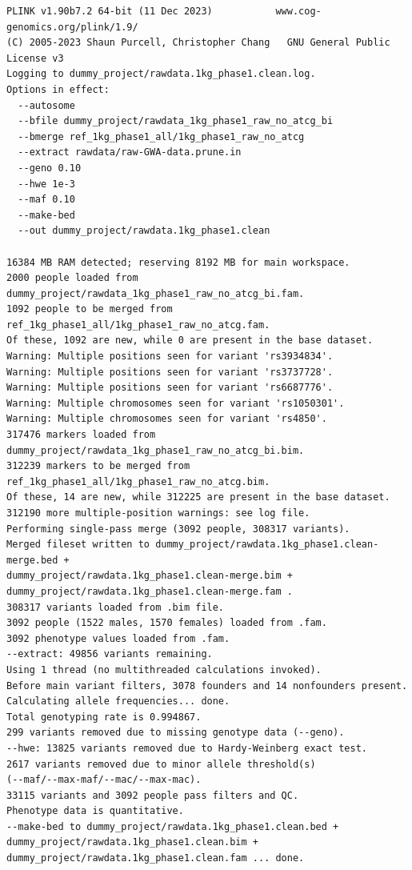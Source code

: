 \documentclass[
]{book}
\begin{document}
\begin{lstlisting}
PLINK v1.90b7.2 64-bit (11 Dec 2023)           www.cog-genomics.org/plink/1.9/
(C) 2005-2023 Shaun Purcell, Christopher Chang   GNU General Public License v3
Logging to dummy_project/rawdata.1kg_phase1.clean.log.
Options in effect:
  --autosome
  --bfile dummy_project/rawdata_1kg_phase1_raw_no_atcg_bi
  --bmerge ref_1kg_phase1_all/1kg_phase1_raw_no_atcg
  --extract rawdata/raw-GWA-data.prune.in
  --geno 0.10
  --hwe 1e-3
  --maf 0.10
  --make-bed
  --out dummy_project/rawdata.1kg_phase1.clean

16384 MB RAM detected; reserving 8192 MB for main workspace.
2000 people loaded from dummy_project/rawdata_1kg_phase1_raw_no_atcg_bi.fam.
1092 people to be merged from ref_1kg_phase1_all/1kg_phase1_raw_no_atcg.fam.
Of these, 1092 are new, while 0 are present in the base dataset.
Warning: Multiple positions seen for variant 'rs3934834'.
Warning: Multiple positions seen for variant 'rs3737728'.
Warning: Multiple positions seen for variant 'rs6687776'.
Warning: Multiple chromosomes seen for variant 'rs1050301'.
Warning: Multiple chromosomes seen for variant 'rs4850'.
317476 markers loaded from dummy_project/rawdata_1kg_phase1_raw_no_atcg_bi.bim.
312239 markers to be merged from ref_1kg_phase1_all/1kg_phase1_raw_no_atcg.bim.
Of these, 14 are new, while 312225 are present in the base dataset.
312190 more multiple-position warnings: see log file.
Performing single-pass merge (3092 people, 308317 variants).
Merged fileset written to dummy_project/rawdata.1kg_phase1.clean-merge.bed +
dummy_project/rawdata.1kg_phase1.clean-merge.bim +
dummy_project/rawdata.1kg_phase1.clean-merge.fam .
308317 variants loaded from .bim file.
3092 people (1522 males, 1570 females) loaded from .fam.
3092 phenotype values loaded from .fam.
--extract: 49856 variants remaining.
Using 1 thread (no multithreaded calculations invoked).
Before main variant filters, 3078 founders and 14 nonfounders present.
Calculating allele frequencies... done.
Total genotyping rate is 0.994867.
299 variants removed due to missing genotype data (--geno).
--hwe: 13825 variants removed due to Hardy-Weinberg exact test.
2617 variants removed due to minor allele threshold(s)
(--maf/--max-maf/--mac/--max-mac).
33115 variants and 3092 people pass filters and QC.
Phenotype data is quantitative.
--make-bed to dummy_project/rawdata.1kg_phase1.clean.bed +
dummy_project/rawdata.1kg_phase1.clean.bim +
dummy_project/rawdata.1kg_phase1.clean.fam ... done.
\end{lstlisting}
\end{document}
